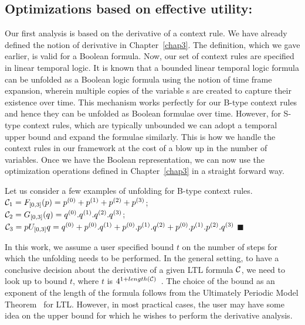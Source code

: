 \subsection{Optimizations based on effective utility:}
\noindent
Our first analysis is based on the derivative of a context rule.
We have already defined the notion of derivative in Chapter~\ref{chap3}.
The definition, which we gave earlier, is valid for a Boolean formula. 
Now, our set of context rules are specified in linear temporal logic.
It is known that a bounded linear temporal logic formula can be 
unfolded as a Boolean logic formula using the notion of time frame expansion,
wherein multiple copies of the variable s are created to capture their existence over time. 
This mechanism works perfectly for our B-type context rules and hence they can be unfolded as Boolean formulae over time.
However, for S-type context rules, which are typically unbounded we can adopt a temporal upper bound and expand the formulae
similarly. This is how we handle the context rules in our framework at the cost of a blow up in the number of variables. 
Once we have the Boolean representation, we can now use the optimization operations defined in Chapter~\ref{chap3} 
in a straight forward way.

\begin{example}
Let us consider a few examples of unfolding for B-type context rules.\\
${\cal{C}}_1 = F_{[0,3]}(p) = p^{(0)} + p^{(1)} + p^{(2)} + p^{(3)}$;\\
${\cal{C}}_2 = G_{[0,3]}(q) = q^{(0)} . q^{(1)} . q^{(2)} . q^{(3)}$;\\
${\cal{C}}_3 = p U_{[0,3]} q = q^{(0)} + p^{(0)}.q^{(1)} + p^{(0)}.p^{(1)}.q^{(2)} + p^{(0)}.p^{(1)}.p^{(2)}.q^{(3)}$
\hfill$\blacksquare$
\end{example}

\noindent
In this work, we assume a 
user specified bound $t$ on the number of steps for 
which the unfolding needs to be performed. 
In the general setting, to have a conclusive decision 
about the derivative of a given LTL formula ${\cal C}$, we need to 
look up to bound $t$, where $t$ is $4 ^{1 + length ({\cal C})}$~\cite{r16}. 
The choice of the bound as an exponent of the length of the formula 
follows from the Ultimately Periodic Model Theorem~\cite{r16} for LTL.
However, in most practical 
cases, the user may have some idea on the upper bound for which 
he wishes to perform the derivative analysis.

